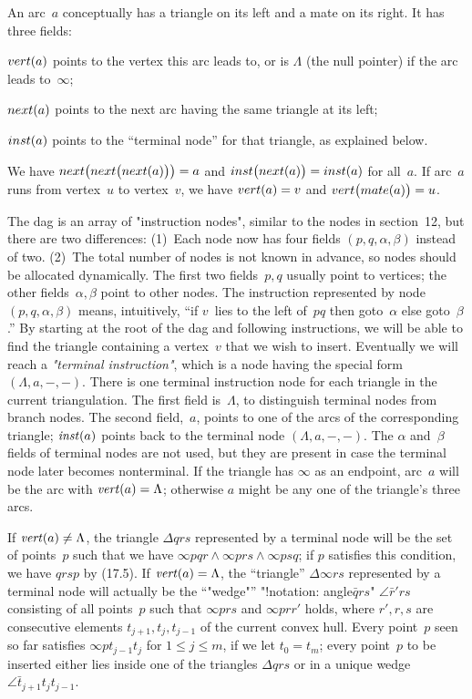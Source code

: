 An arc~$a$ conceptually has a triangle on its left and a mate on its
right. It has three fields:

\smallskip\biba
${\sl vert\/}(a)$ points to the vertex this arc leads to, or is
$\Lambda$ (the null pointer) if the arc leads to~$\infty$;

\smallskip\biba
${\sl next\/}(a)$ points to the next arc having the same triangle at
its left;

\smallskip\biba
${\sl inst\/}(a)$ points to the ``terminal node'' for that triangle,
as explained below.

\smallskip\noindent
We have ${\sl next\/}\bigl({\sl next\/}\bigl({\sl
next\/}(a)\bigr)\bigr)=a$ and
${\sl inst\/}\bigl({\sl next\/}(a)\bigr)={\sl inst\/}(a)$ for all~$a$.
If arc~$a$ runs from vertex~$u$ to vertex~$v$, we have ${\sl
vert\/}(a)=v$ and ${\sl vert\/}\bigl({\sl mate\/}(a)\bigr)=u$.

The dag is an array of "instruction nodes", similar to the nodes in
section~12, but there are two differences: (1)~Each node now has four
fields $(p,q,\alpha,\beta)$ instead of two. (2)~The total number of
nodes is not known in advance, so nodes should be allocated
dynamically. The first two fields~$p,q$ usually point to vertices; the
other fields~$\alpha,\beta$ point to other nodes. The instruction
represented by node $(p,q,\alpha,\beta)$ means, intuitively, ``if
$v$~lies to the left of~$pq$ then goto~$\alpha$ else goto~$\beta$.''
By starting at the root of the dag and following instructions, we will
be able to find the triangle containing a vertex~$v$ that we wish to
insert. Eventually we will reach a {\it"terminal instruction"}, which
is a node having the special form $(\Lambda,a,-,-)$. There is
one terminal instruction node for each triangle in the current
triangulation. The first field is~$\Lambda$, to distinguish terminal
nodes from branch nodes. The second field,~$a$, points to one of the
arcs of the corresponding triangle; ${\it inst\/}(a)$ points back to
the terminal node $(\Lambda,a,-,-)$. The $\alpha$ and~$\beta$
fields of terminal nodes are not used, but they are present in case
the terminal node later becomes nonterminal. If the triangle has $\infty$ as
an endpoint, arc~$a$ will be the arc with ${\it vert\/}(a)=\Lambda$;
otherwise $a$ might be any one of the triangle's three arcs.

If ${\it vert\/}(a)\neq\Lambda$, the triangle $\Delta qrs$ represented
by a terminal node will be the set of points~$p$ such that we have
$\infty pqr\wedge\infty prs\wedge\infty psq$; if $p$ satisfies this
condition, we have $qrsp$ by (17.5). If ${\it vert\/}(a)=\Lambda$, the
``triangle'' $\Delta \infty rs$ represented by a terminal node will
actually be the ``"wedge"'' "!notation: angle$\bar qrs$"
$\angle \bar{r}'rs$ consisting of all points~$p$ such that $\infty
prs$ and $\infty prr'$ holds, where $r',r,s$ are consecutive elements
$t_{j+1},t_j,t_{j-1}$ of the current convex hull. Every point~$p$ seen
so far satisfies $\infty pt_{j-1}t_j$ for $1\leq j\leq m$, if we let
$t_0=t_m$; every point~$p$ to be inserted either lies inside one of
the triangles $\Delta qrs$ or in a unique wedge
$\angle\bar{t}_{j+1}t_jt_{j-1}$.

